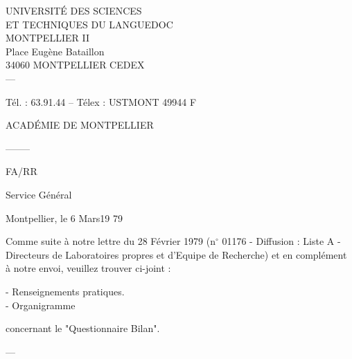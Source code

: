 \begin{center}
UNIVERSITÉ DES SCIENCES\\
ET TECHNIQUES DU LANGUEDOC\\
MONTPELLIER II\\
Place Eugène Bataillon\\
34060 MONTPELLIER CEDEX\\
---
\end{center}
Tél. : 63.91.44 -- Télex : USTMONT 49944 F

ACADÉMIE DE MONTPELLIER
\begin{center}--------\end{center}
FA/RR

Service Général

Montpellier, le 6 Mars\hfill 19 79

\begin{center}\end{center}

Comme suite à notre lettre du 28 Février 1979
(n$^\circ$ 01176 - Diffusion : Liste A - Directeurs de Laboratoires
propres et d'Equipe de Recherche) et en complément à notre
envoi, veuillez trouver ci-joint :

- Renseignements pratiques.\\
- Organigramme

concernant le "Questionnaire Bilan".

\begin{center}---\end{center}

